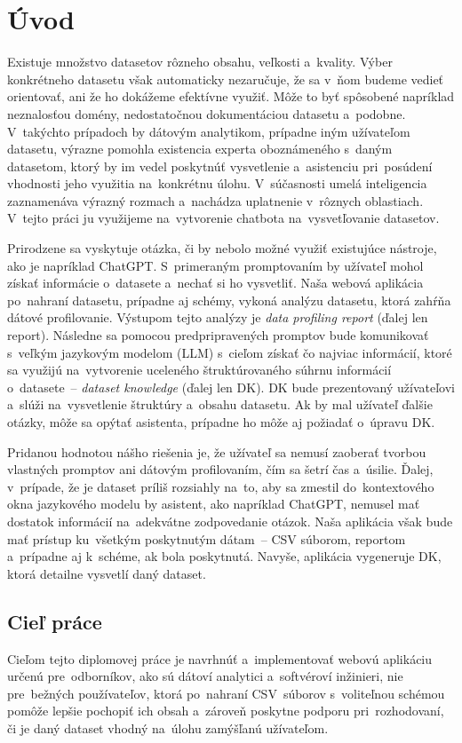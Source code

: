 \chapter{Úvod}

Existuje množstvo datasetov rôzneho obsahu, veľkosti a~kvality. Výber konkrétneho datasetu však automaticky nezaručuje, že sa v~ňom budeme vedieť orientovať, ani že ho dokážeme efektívne využiť. Môže to byť spôsobené napríklad neznalosťou domény, nedostatočnou dokumentáciou datasetu a~podobne. V~takýchto prípadoch by dátovým analytikom, prípadne iným užívateľom datasetu, výrazne pomohla existencia experta oboznámeného s~daným datasetom, ktorý by im vedel poskytnúť vysvetlenie a~asistenciu pri~posúdení vhodnosti jeho využitia na~konkrétnu úlohu. V~súčasnosti umelá inteligencia zaznamenáva výrazný rozmach a~nachádza uplatnenie v~rôznych oblastiach. V~tejto práci ju využijeme na~vytvorenie chatbota na~vysvetľovanie datasetov.

Prirodzene sa vyskytuje otázka, či by nebolo možné využiť existujúce nástroje, ako je napríklad ChatGPT. S~primeraným promptovaním by užívateľ mohol získať informácie o~datasete a~nechať si ho vysvetliť. Naša webová aplikácia po~nahraní datasetu, prípadne aj schémy, vykoná analýzu datasetu, ktorá zahŕňa dátové profilovanie. Výstupom tejto analýzy je \textit{data profiling report} (ďalej len report). Následne sa pomocou predpripravených promptov bude komunikovať s~veľkým jazykovým modelom (LLM) s~cieľom získať čo najviac informácií, ktoré sa využijú na~vytvorenie uceleného štruktúrovaného súhrnu informácií o~datasete~-- \textit{dataset knowledge} (ďalej len DK). DK bude prezentovaný užívateľovi a~slúži na~vysvetlenie štruktúry a~obsahu datasetu. Ak by mal užívateľ ďalšie otázky, môže sa opýtať asistenta, prípadne ho môže aj požiadať o~úpravu DK.

Pridanou hodnotou nášho riešenia je, že užívateľ sa nemusí zaoberať tvorbou vlastných promptov ani dátovým profilovaním, čím sa šetrí čas a~úsilie. Ďalej, v~prípade, že je dataset príliš rozsiahly na~to, aby sa zmestil do~kontextového okna jazykového modelu by asistent, ako napríklad ChatGPT, nemusel mať dostatok informácií na~adekvátne zodpovedanie otázok. Naša aplikácia však bude mať prístup ku~všetkým poskytnutým dátam~-- CSV súborom, reportom a~prípadne aj k~schéme, ak bola poskytnutá. Navyše, aplikácia vygeneruje DK, ktorá detailne vysvetlí daný dataset.

\section{Cieľ práce}

Cieľom tejto diplomovej práce je navrhnúť a~implementovať webovú aplikáciu určenú pre~odborníkov, ako sú dátoví analytici a~softvéroví inžinieri, nie pre~bežných používateľov, ktorá po~nahraní CSV~súborov s~voliteľnou schémou pomôže lepšie pochopiť ich obsah a~zároveň poskytne podporu pri~rozhodovaní, či je daný dataset vhodný na~úlohu zamýšľanú užívateľom.
